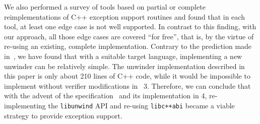 We also performed a survey of tools based on partial or complete
reimplementations of C++ exception support routines and found that in
each tool, at least one edge case is not well supported. In contrast to
this finding, with our approach, all those edge cases are covered ``for
free'', that is, by the virtue of re-using an existing, complete
implementation. Contrary to the prediction made
in~, we have found that with a suitable
target language, implementing a new unwinder can be relatively simple.
The unwinder implementation described in this paper is only about 210
lines of C++ code, while it would be impossible to implement without
verifier modifications in \divine{}~3. Therefore, we can conclude that with
the advent of the \divm{} specification~ and its
implementation in \divine{} 4, re-implementing the \texttt{libunwind} API
and re-using \texttt{libc++abi} became a viable strategy to provide
exception support.
